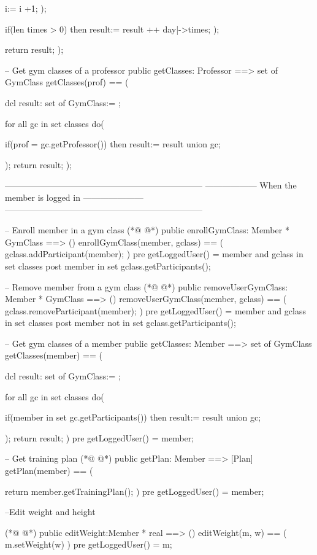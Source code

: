 \begin{vdmpp}[breaklines=true]
     i:= i +1; 
    );
    
    if(len times > 0) then
    result:= result ++ {day|->times};
  );
   
  return result;
 );
 
 -- Get gym classes of a professor
 public getClasses: Professor ==> set of GymClass
 getClasses(prof) == (
  
  dcl result: set of GymClass:= {};
  
  for all gc in set classes do(
   
   if(prof = gc.getProfessor()) then result:= result union {gc};
    
  );
  return result;
 );
 
  ---------------------------------------------------------------------
  ------------------ When the member is logged in ---------------------
  ---------------------------------------------------------------------
  
 -- Enroll member in a gym class
(*@
\label{enrollGymClass:253}
@*)
 public enrollGymClass: Member * GymClass ==> ()
 enrollGymClass(member, gclass) == ( 
  gclass.addParticipant(member); 
 )
 pre getLoggedUser() = member and gclass in set classes
 post member in set gclass.getParticipants();
 
 
 -- Remove member from a gym class
(*@
\label{removeUserGymClass:262}
@*)
 public removeUserGymClass: Member * GymClass ==> ()
 removeUserGymClass(member, gclass) == (
  gclass.removeParticipant(member);
 )
 pre getLoggedUser() = member and gclass in set classes
 post member not in set gclass.getParticipants();
 

 -- Get gym classes of a member
 public getClasses: Member ==> set of GymClass
 getClasses(member) == (
  
  dcl result: set of GymClass:= {};
  
  for all gc in set classes do(
   
   if(member in set gc.getParticipants()) then result:= result union {gc};
    
  );
  return result;
 )
 pre getLoggedUser() = member;
 
 -- Get training plan  
(*@
\label{getPlan:286}
@*)
 public getPlan: Member ==> [Plan]
 getPlan(member) == (
  
  return member.getTrainingPlan();
 )
 pre getLoggedUser() = member;
 
 
 --Edit weight and height
 
(*@
\label{editWeight:296}
@*)
 public editWeight:Member * real ==> ()
 editWeight(m, w) ==  (
  m.setWeight(w)
 ) 
 pre getLoggedUser() = m;
  

\end{vdmpp}
